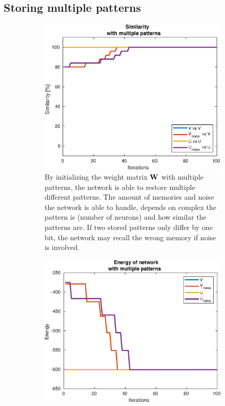 \subsection{Storing multiple patterns}
\begin{figure}[H]
    \centering
    \begin{subfigure}{0.49\textwidth}
        \includegraphics[width=\textwidth]{figs/multiple-patterns.eps}
        \caption{By initializing the weight matrix $\bf W$ with multiple patterns, the network is able to restore multiple different patterns. The amount of memories and noise the network is able to handle, depends on complex the pattern is (number of neurons) and how similar the patterns are. If two stored patterns only differ by one bit, the network may recall the wrong memory if noise is involved. }
        \label{fig:multiple-similarity}
    \end{subfigure}
    \begin{subfigure}{0.49\textwidth}
        \includegraphics[width=\textwidth]{figs/multiple-patterns-energy.eps}

\end{subfigure}
\end{figure}
